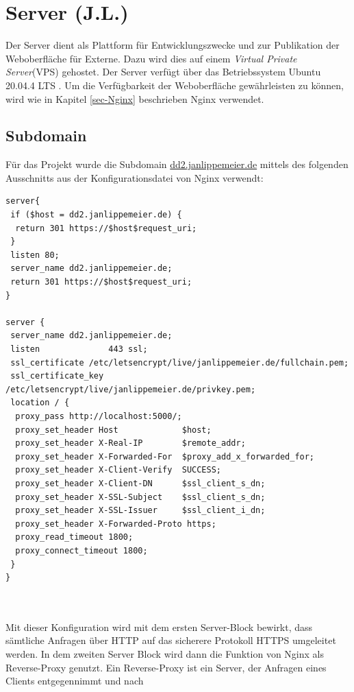 \section{Server (J.L.)}
\label{sec-server}

Der Server dient als Plattform für Entwicklungszwecke und zur Publikation der Weboberfläche für Externe.
Dazu wird dies auf einem \textit{Virtual Private Server}(VPS) gehostet. Der Server verfügt über das Betriebssystem Ubuntu 20.04.4 LTS \cite{ubuntu}. 
Um die Verfügbarkeit der Weboberfläche gewährleisten zu können, wird wie in Kapitel \ref{sec-Nginx} beschrieben Nginx verwendet.

\subsection{Subdomain}
Für das Projekt wurde die Subdomain \href{https://dd2.janlippemeier.de}{dd2.janlippemeier.de} mittels des folgenden Ausschnitts aus der Konfigurationsdatei von Nginx verwendt:
~\\
\begin{lstlisting}[caption={Auszug Nginx Konfiguration}, captionpos=b, label={fig:Nginx Konfiguration}]
server{
 if ($host = dd2.janlippemeier.de) {
  return 301 https://$host$request_uri;
 }
 listen 80;
 server_name dd2.janlippemeier.de;
 return 301 https://$host$request_uri;
}

server {
 server_name dd2.janlippemeier.de;
 listen              443 ssl;
 ssl_certificate /etc/letsencrypt/live/janlippemeier.de/fullchain.pem;
 ssl_certificate_key /etc/letsencrypt/live/janlippemeier.de/privkey.pem;
 location / {
  proxy_pass http://localhost:5000/;
  proxy_set_header Host             $host;
  proxy_set_header X-Real-IP        $remote_addr;
  proxy_set_header X-Forwarded-For  $proxy_add_x_forwarded_for;
  proxy_set_header X-Client-Verify  SUCCESS;
  proxy_set_header X-Client-DN      $ssl_client_s_dn;
  proxy_set_header X-SSL-Subject    $ssl_client_s_dn;
  proxy_set_header X-SSL-Issuer     $ssl_client_i_dn;
  proxy_set_header X-Forwarded-Proto https;
  proxy_read_timeout 1800;
  proxy_connect_timeout 1800;
 }
}
	
\end{lstlisting}~\\
Mit dieser Konfiguration wird mit dem ersten Server-Block bewirkt, dass sämtliche Anfragen über HTTP 
auf das sicherere Protokoll HTTPS umgeleitet werden. In dem zweiten Server Block wird dann die Funktion 
von Nginx als Reverse-Proxy genutzt. Ein Reverse-Proxy ist ein Server, der Anfragen eines Clients entgegennimmt und nach
